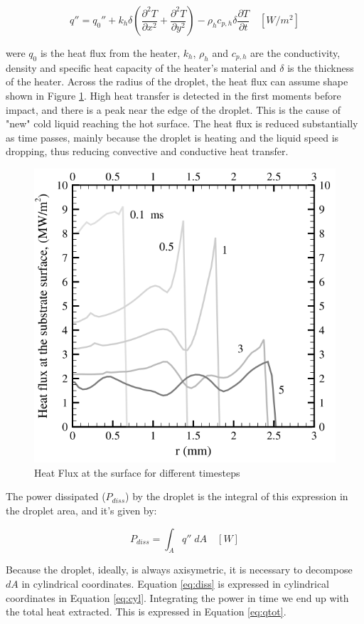 \begin{equation}
q''=q_0''+k_h \delta (\frac{{\partial}^2 T}{\partial x^2}+\frac{{\partial}^2 T}{\partial y^2})-\rho_h c_{p,h} \delta \frac{{\partial} T}{\partial t} \quad [W/m^2]
\end{equation}

were $q_0$ is the heat flux from the heater, $k_h$, $\rho_h$ and $c_{p,h}$ are the conductivity, density and specific heat capacity of the heater's material and $\delta$ is the thickness of the heater. Across the radius of the droplet, the heat flux can assume shape shown in Figure \ref{fig:fluxo}. High heat transfer is detected in the first moments before impact, and there is a peak near the edge of the droplet. This is the cause of "new" cold liquid reaching the hot surface. The heat flux is reduced substantially as time passes, mainly because the droplet is heating and the liquid speed is dropping, thus reducing convective and conductive heat transfer.

\begin{figure}[h]
\centering
\includegraphics[width=0.5\linewidth]{Figures/2.Chapter/fluxo.png}
\caption {Heat Flux at the surface for different timesteps}
\label{fig:fluxo}
\end{figure}

\par The power dissipated ($P_{diss}$) by the droplet is the integral of this expression in the droplet area, and it's given by:

\begin{equation}\label{eq:diss}
P_{diss}= \int_{A} q'' \; dA \quad [W]
\end{equation}

\par Because the droplet, ideally, is always axisymetric, it is necessary to decompose $dA$ in cylindrical coordinates. Equation \ref{eq:diss} is expressed in cylindrical coordinates in Equation \ref{eq:cyl}. Integrating the power in time we end up with the total heat extracted. This is expressed in Equation \ref{eq:qtot}.

